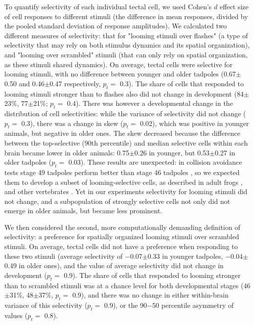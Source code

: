\documentclass{article}
\begin{document}
To quantify selectivity of each individual tectal cell, we used Cohen’s $d$ effect size of cell  responses to different stimuli (the difference in mean responses, divided by the pooled standard deviation of response amplitudes). We calculated two different measures of selectivity: that for "looming stimuli over flashes" (a type of selectivity that may rely on both stimulus dynamics and its spatial organization), and "looming over scrambled" stimuli (that can only rely on spatial organization, as these stimuli shared dynamics). On average, tectal cells were selective for looming stimuli, with no difference between younger and older tadpoles (0.67$\pm$0.50 and 0.46$\pm$0.47 respectively, $p_t=$ 0.3). The share of cells that responded to looming stimuli stronger than to flashes also did not change in development (84$\pm$23\%, 77$\pm$21\%; $p_t=$ 0.4). There was however a developmental change in the distribution of cell selectivities: while the variance of selectivity did not change ($p_t=$ 0.3), there was a change in skew ($p_t=$ 0.02), which was positive in younger animals, but negative in older ones. The skew decreased because the difference between the top-selective (90th percentile) and median selective cells within each brain became lower in older animals: 0.75$\pm$0.26 in younger, but 0.53$\pm$0.27 in older tadpoles ($p_t=$ 0.03). These results are unexpected: in collision avoidance tests stage 49 tadpoles perform better than stage 46 tadpoles \citep{dong2009}, so we expected them to develop a subset of looming-selective cells, as described in adult frogs \citep{nakagawa2010otneurons,baranauskas2012}, and other vertebrates \citep{wang1992pigeon,wu2005pigeon,liu2011cat}. Yet in our experiments selectivity for looming stimuli did not change, and a subpopulation of strongly selective cells not only did not emerge in older animals, but became less prominent.

We then considered the second, more computationally demanding definition of selectivity: a preference for spatially organized looming stimuli over scrambled stimuli. On average, tectal cells did not have a preference when responding to these two stimuli (average selectivity of $-$0.07$\pm$0.33 in younger tadpoles, $-$0.04$\pm$0.49 in older ones), and the value of average selectivity did not change in development ($p_t=$ 0.9). The share of cells that responded to looming stronger than to scrambled stimuli was at a chance level for both developmental stages (46$\pm$31\%, 48$\pm$37\%, $p_t=$ 0.9), and there was no change in either within-brain variance of this selectivity ($p_t=$ 0.9), or the 90$-$50 percentile asymmetry of values ($p_t=$ 0.8).
\end{document}
